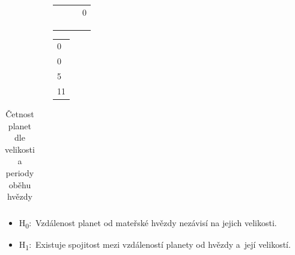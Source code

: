 \documentclass[a4paper,12pt]{article}
\begin{document}
\begin{figure}[!htb]
  \centering
  \begin{subfigure}[b]{0.5\textwidth}
\begin{tabular}{| l| l| l| l|}
  \hline
 & {\cellcolor[rgb]{0.85, 0.85, 0.85}{ Lava }} & {\cellcolor[rgb]{0.85, 0.85, 0.85}{ Hot }} & {\cellcolor[rgb]{0.85, 0.85, 0.85}{ Normal }} \\ 
  \hline
{\cellcolor[rgb]{0.85, 0.85, 0.85}{ Mercurian }} & {\cellcolor[rgb]{ 0.985641025641026 ,  1 ,  0.985641025641026 }{ 14 }} & {\cellcolor[rgb]{ 0.988717948717949 ,  1 ,  0.988717948717949 }{ 11 }} & 0 \\ 
   \hline
{\cellcolor[rgb]{0.85, 0.85, 0.85}{ Earth }} & {\cellcolor[rgb]{ 0.48 ,  1 ,  0.48 }{ 507 }} & {\cellcolor[rgb]{ 0.313846153846154 ,  1 ,  0.313846153846154 }{ 669 }} & {\cellcolor[rgb]{ 0.950769230769231 ,  1 ,  0.950769230769231 }{ 48 }} \\ 
   \hline
{\cellcolor[rgb]{0.85, 0.85, 0.85}{ Neptunian }} & {\cellcolor[rgb]{ 0.863589743589744 ,  1 ,  0.863589743589744 }{ 133 }} & {\cellcolor[rgb]{ 0 ,  1 ,  0 }{ 975 }} & {\cellcolor[rgb]{ 0.794871794871795 ,  1 ,  0.794871794871795 }{ 200 }} \\ 
   \hline
{\cellcolor[rgb]{0.85, 0.85, 0.85}{ Jovian }} & {\cellcolor[rgb]{ 0.602051282051282 ,  1 ,  0.602051282051282 }{ 388 }} & {\cellcolor[rgb]{ 0.866666666666667 ,  1 ,  0.866666666666667 }{ 130 }} & {\cellcolor[rgb]{ 0.942564102564103 ,  1 ,  0.942564102564103 }{ 56 }} \\ 
   \hline
\end{tabular}  \end{subfigure}
  \begin{subfigure}[b]{0.2\textwidth}
\begin{tabular}{| l|}
  \hline
{\cellcolor[rgb]{0.85, 0.85, 0.85}{ Cold }} \\ 
  \hline
0 \\ 
   \hline
0 \\ 
   \hline
5 \\ 
   \hline
11 \\ 
   \hline
\end{tabular}  \end{subfigure}
  \vspace{-1cm}
\end{figure}
\begin{table}[ht]
\centering
\begin{tabular}{| l| l|}
   \hline
\end{tabular}
\caption{Četnost planet dle velikosti a periody oběhu hvězdy} 
\end{table}
\begin{itemize}
  \item H\textsubscript{0}:~Vzdálenost planet od mateřské hvězdy nezávisí na jejich velikosti.
  \item H\textsubscript{1}:~Existuje spojitost mezi vzdáleností planety od hvězdy a~její velikostí.
\end{itemize}
\end{document}
